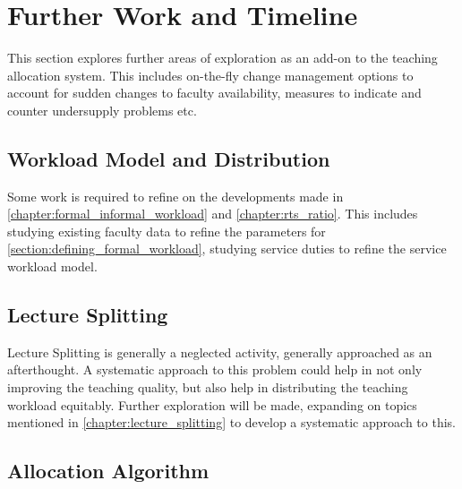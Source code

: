 \chapter{Further Work and Timeline}

This section explores further areas of exploration as an add-on to the teaching allocation system. This includes on-the-fly change management options to account for sudden changes to faculty availability, measures to indicate and counter undersupply problems etc.

\section{Workload Model and Distribution}
Some work is required to refine on the developments made in \autoref{chapter:formal_informal_workload} and \autoref{chapter:rts_ratio}. This includes studying existing faculty data to refine the parameters for \autoref{section:defining_formal_workload}, studying service duties to refine the service workload model.

\section{Lecture Splitting}

Lecture Splitting is generally a neglected activity, generally approached as an afterthought. A systematic approach to this problem could help in not only improving the teaching quality, but also help in distributing the teaching workload equitably. Further exploration will be made, expanding on topics mentioned in \autoref{chapter:lecture_splitting} to develop a systematic approach to this.

\section{Allocation Algorithm}


